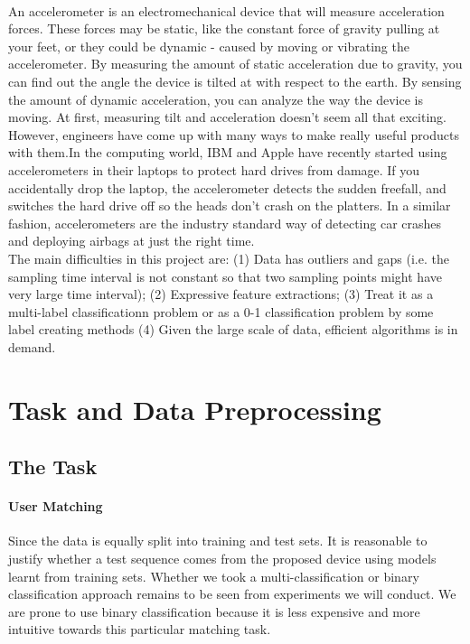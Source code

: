 \documentclass[11pt,letterpaper]{article}
\begin{document}
\paragraph{} An accelerometer is an electromechanical device that will measure acceleration forces. These forces may be static, like the constant force of gravity pulling at your feet, or they could be dynamic - caused by moving or vibrating the accelerometer. By measuring the amount of static acceleration due to gravity, you can find out the angle the device is tilted at with respect to the earth. By sensing the amount of dynamic acceleration, you can analyze the way the device is moving. At first, measuring tilt and acceleration doesn't seem all that exciting. However, engineers have come up with many ways to make really useful products with them.In the computing world, IBM and Apple have recently started using accelerometers in their laptops to protect hard drives from damage. If you accidentally drop the laptop, the accelerometer detects the sudden freefall, and switches the hard drive off so the heads don't crash on the platters. In a similar fashion, accelerometers are the industry standard way of detecting car crashes and deploying airbags at just the right time.\\

The main difficulties in this project are: (1) Data has outliers and gaps (i.e. the sampling time interval is not constant so that two sampling points might have very large time interval); (2) Expressive feature extractions; (3) Treat it as a multi-label classificationn problem or as a 0-1 classification problem by some label creating methods (4) Given the large scale of data, efficient algorithms is in demand.

\section{Task and Data Preprocessing}
\label{sec:taskAndData}

\subsection{The Task}
\label{sec:task}
\paragraph{User Matching} Since the data is equally split into training and test sets. It is reasonable to justify whether a test sequence comes from the proposed device using models learnt from training sets. Whether we took a multi-classification or binary classification approach remains to be seen from experiments we will conduct. We are prone to use binary classification because it is less expensive and more intuitive towards this particular matching task.
\end{document}
